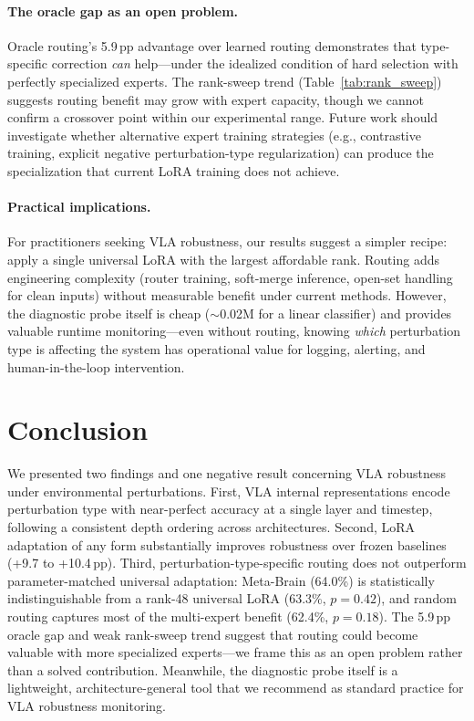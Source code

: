 \documentclass[letterpaper]{article}
\newcommand{\ours}{Meta-Brain}
\newcommand{\pp}{\,\text{pp}}
\begin{document}
\paragraph{The oracle gap as an open problem.}
Oracle routing's 5.9$\pp$ advantage over learned routing demonstrates that type-specific correction \emph{can} help---under the idealized condition of hard selection with perfectly specialized experts. The rank-sweep trend (Table~\ref{tab:rank_sweep}) suggests routing benefit may grow with expert capacity, though we cannot confirm a crossover point within our experimental range. Future work should investigate whether alternative expert training strategies (e.g., contrastive training, explicit negative perturbation-type regularization) can produce the specialization that current LoRA training does not achieve.

\paragraph{Practical implications.}
For practitioners seeking VLA robustness, our results suggest a simpler recipe: apply a single universal LoRA with the largest affordable rank. Routing adds engineering complexity (router training, soft-merge inference, open-set handling for clean inputs) without measurable benefit under current methods. However, the diagnostic probe itself is cheap ($\sim$0.02M for a linear classifier) and provides valuable runtime monitoring---even without routing, knowing \emph{which} perturbation type is affecting the system has operational value for logging, alerting, and human-in-the-loop intervention.

\section{Conclusion}
\label{sec:conclusion}

We presented two findings and one negative result concerning VLA robustness under environmental perturbations. First, VLA internal representations encode perturbation type with near-perfect accuracy at a single layer and timestep, following a consistent depth ordering across architectures. Second, LoRA adaptation of any form substantially improves robustness over frozen baselines (+9.7 to +10.4$\pp$). Third, perturbation-type-specific routing does not outperform parameter-matched universal adaptation: \ours{} (64.0\%) is statistically indistinguishable from a rank-48 universal LoRA (63.3\%, $p=0.42$), and random routing captures most of the multi-expert benefit (62.4\%, $p=0.18$). The 5.9$\pp$ oracle gap and weak rank-sweep trend suggest that routing could become valuable with more specialized experts---we frame this as an open problem rather than a solved contribution. Meanwhile, the diagnostic probe itself is a lightweight, architecture-general tool that we recommend as standard practice for VLA robustness monitoring.
\end{document}
